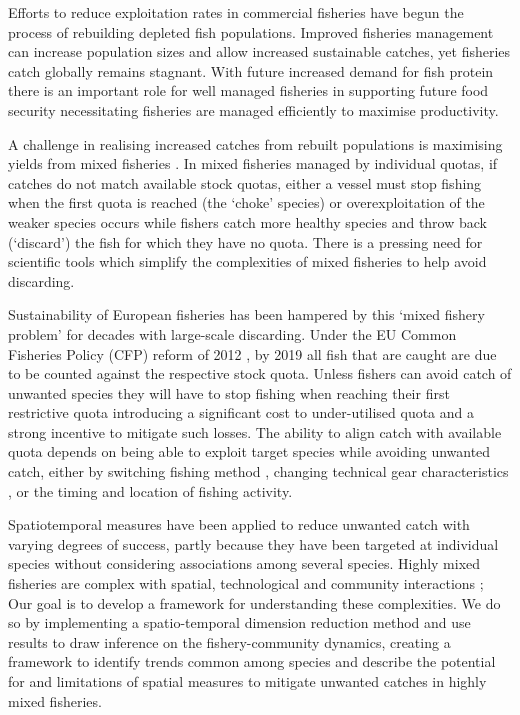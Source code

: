 \documentclass{nature}
\begin{document}
\begin{linenumbers}
 Efforts to reduce exploitation rates in commercial fisheries
have begun the process of rebuilding depleted fish populations\cite{Worm2009}.
Improved fisheries management  can increase
population sizes and allow increased sustainable catches, yet fisheries catch
globally remains stagnant\cite{FAO2016}. With future increased demand for fish
protein  there is an important role for well managed
fisheries in supporting future food security \cite{Mcclanahan2015}
  necessitating
	 fisheries are managed efficiently to
maximise productivity.

A  challenge in realising increased catches
from rebuilt populations is maximising yields from mixed fisheries
\cite{Branch2008, Kuriyama2016, Ulrich2016}. In mixed fisheries managed by individual quotas, if catches do not
match available stock quotas, either a vessel must stop fishing when the first
quota is reached (the `choke' species) or overexploitation of the weaker
species occurs while fishers  catch more healthy species and throw
back (`discard') the fish for which they have no quota\cite{Batsleer2015}.
There is a pressing need for scientific tools which
simplify the complexities of mixed fisheries to help avoid discarding. 

Sustainability of European fisheries has been hampered by this `mixed fishery
problem' for decades with large-scale discarding\cite{Uhlmann2014}.   Under the EU Common Fisheries
Policy (CFP) reform of 2012 , by 2019 all fish that are caught are due to be
counted against the respective stock quota.
    Unless
fishers can avoid catch of unwanted species they will have to stop fishing when
reaching their first restrictive quota  introducing a
 significant
cost to  under-utilised quota\cite{Ulrich2016} and
 a strong
incentive to mitigate such losses\cite{Condie2013}. The ability  to
align  catch with available quota depends on being able to exploit target
species while avoiding unwanted catch, either by switching fishing
method , changing technical gear characteristics
, or the timing and location of
fishing activity\cite{vanPutten2012a}. 

Spatiotemporal  measures  have been applied to reduce unwanted catch with varying
degrees of success\cite{Needle2011, Dunn2014a}, partly because
 they
have  been targeted at individual species without
considering associations  among several species. Highly mixed
fisheries are complex with spatial, technological and community interactions
;    Our goal is to
develop a framework for understanding these complexities. We do so by
implementing a spatio-temporal dimension reduction method and use  results
to draw inference on the fishery-community dynamics, creating a framework to
identify trends common among species  and describe
the potential for and limitations of spatial
measures to mitigate
unwanted catches in highly mixed fisheries.



\end{linenumbers}
\end{document}
